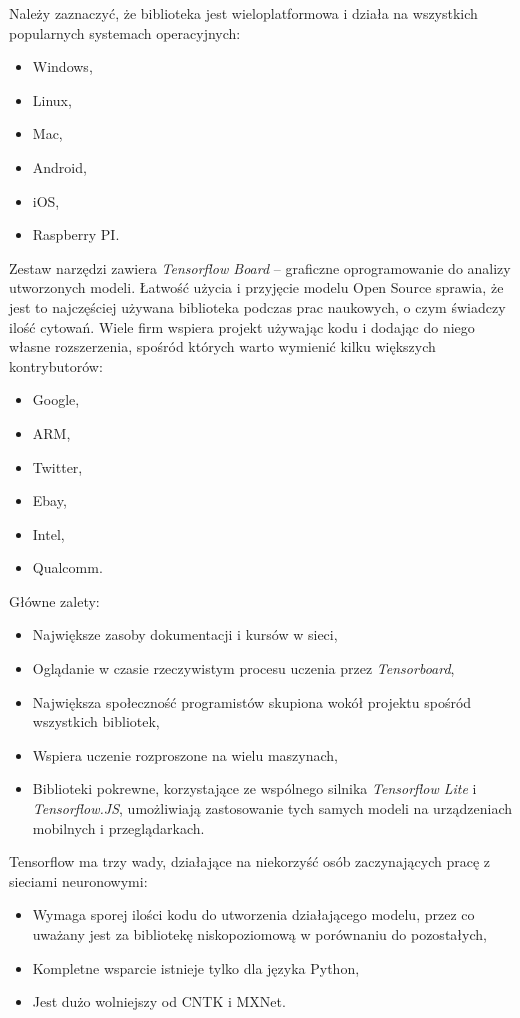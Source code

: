 \documentclass[12pt,a4paper,twoside,titlepage,openright]{book}
\begin{document}
\begin{itemize}
Należy zaznaczyć, że biblioteka jest wieloplatformowa i działa na wszystkich popularnych systemach operacyjnych:
\begin{itemize}
\item Windows,
\item Linux,
\item Mac,
\item Android,
\item iOS,
\item Raspberry PI.
\end{itemize}

Zestaw narzędzi zawiera \textit{Tensorflow Board} -- graficzne oprogramowanie do analizy utworzonych modeli. Łatwość użycia i przyjęcie modelu Open Source sprawia, że jest to najczęściej używana biblioteka podczas prac naukowych, o czym świadczy ilość cytowań. \cite{siteTensorflowCitations} Wiele firm wspiera projekt używając kodu i dodając do niego własne rozszerzenia, spośród których warto wymienić kilku większych kontrybutorów:
\begin{itemize}
\item Google,
\item ARM,
\item Twitter,
\item Ebay,
\item Intel,
\item Qualcomm.
\end{itemize}

Główne zalety:
\begin{itemize}
\item Największe zasoby dokumentacji i kursów w sieci,
\item Oglądanie w czasie rzeczywistym procesu uczenia przez \textit{Tensorboard},
\item Największa społeczność programistów skupiona wokół projektu spośród wszystkich bibliotek,
\item Wspiera uczenie rozproszone na wielu maszynach,
\item Biblioteki pokrewne, korzystające ze wspólnego silnika \textit{Tensorflow Lite} i \textit{Tensorflow.JS}, umożliwiają zastosowanie tych samych modeli na urządzeniach mobilnych i przeglądarkach.
\end{itemize}

Tensorflow ma trzy wady, działające na niekorzyść osób zaczynających pracę z sieciami neuronowymi:
\begin{itemize}
\item Wymaga sporej ilości kodu do utworzenia działającego modelu, przez co uważany jest za bibliotekę niskopoziomową w porównaniu do pozostałych,
\item Kompletne wsparcie istnieje tylko dla języka Python, 
\item Jest dużo wolniejszy od CNTK i MXNet.\cite{DBLP:journals/corr/ShiWXC16}
\end{itemize}


\end{itemize}
\end{document}
